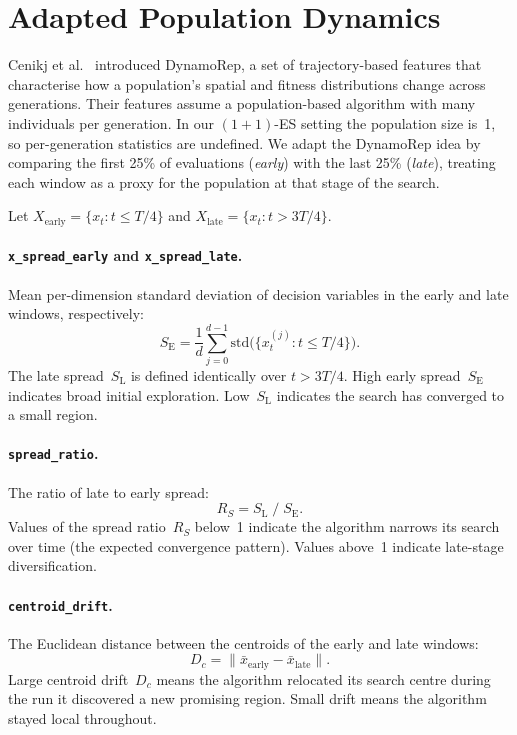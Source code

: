 \section{Adapted Population Dynamics}
\label{sec:features:dynamo}

Cenikj et al.~\cite{cenikj2023dynamorep} introduced DynamoRep, a set of
trajectory-based features that characterise how a population's spatial and
fitness distributions change across generations.  Their features assume a
population-based algorithm with many individuals per generation.  In our
$(1{+}1)$-ES setting the population size is~1, so per-generation statistics
are undefined.  We adapt the DynamoRep idea by comparing the first 25\% of
evaluations (\emph{early}) with the last 25\% (\emph{late}), treating each
window as a proxy for the population at that stage of the search.

Let $X_{\mathrm{early}} = \{x_t : t \le T/4\}$ and
$X_{\mathrm{late}} = \{x_t : t > 3T/4\}$.

\paragraph{\texttt{x\_spread\_early} and \texttt{x\_spread\_late}.}
Mean per-dimension standard deviation of decision variables in the early and
late windows, respectively:
\begin{equation}
\label{eq:spread}
  S_{\mathrm{E}}
    = \frac{1}{d}\sum_{j=0}^{d-1}
      \mathrm{std}\!\bigl(\{x_t^{(j)} : t \le T/4\}\bigr).
\end{equation}
The late spread~$S_{\mathrm{L}}$ is defined identically over $t > 3T/4$.
High early spread~$S_{\mathrm{E}}$ indicates broad initial exploration.
Low~$S_{\mathrm{L}}$ indicates the search has converged to a small
region.

\paragraph{\texttt{spread\_ratio}.}
The ratio of late to early spread:
\begin{equation}
\label{eq:spread_ratio}
  R_S = S_{\mathrm{L}} \;/\; S_{\mathrm{E}}.
\end{equation}
Values of the spread ratio~$R_S$ below~1 indicate the algorithm narrows
its search over time (the expected convergence pattern). Values above~1
indicate late-stage diversification.

\paragraph{\texttt{centroid\_drift}.}
The Euclidean distance between the centroids of the early and late windows:
\begin{equation}
\label{eq:centroid}
  D_c
    = \bigl\lVert \bar{x}_{\mathrm{early}}
      - \bar{x}_{\mathrm{late}} \bigr\rVert.
\end{equation}
Large centroid drift~$D_c$ means the algorithm relocated its search
centre during the run it discovered a new promising region.  Small drift means the algorithm stayed
local throughout.

